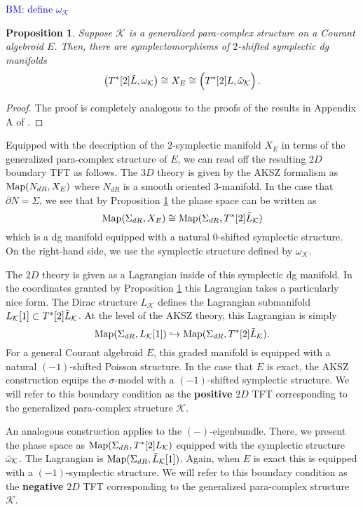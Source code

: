 \documentclass{article}
\newcommand{\KK}{\mathcal{K}}
\newtheorem{proposition}[theorem]{Proposition}
\theoremstyle{definition}
\theoremstyle{remark}
\def\brian{\textcolor{blue}{BM: }\textcolor{blue}}
\begin{document}
\brian{define $\omega_{\KK}$}

\begin{proposition}\label{prop: symp}
Suppose $\KK$ is a generalized para-complex structure on a Courant algebroid $E$.
Then, there are symplectomorphisms of $2$-shifted symplectic dg manifolds
\[
\left(T^*[2] \Tilde{L}, \omega_{\KK} \right) \cong X_E \cong \left(T^*[2] \overset{\;}{L}, \Tilde{\omega}_{\KK} \right) .
\]
\end{proposition}
\begin{proof}
The proof is completely analogous to the proofs of the results in Appendix A of \cite{Cattaneo:2009zx}.
\end{proof}

Equipped with the description of the $2$-symplectic manifold $X_E$ in terms of the generalized para-complex structure of $E$, we can read off the resulting $2D$ boundary TFT as follows.
The $3D$ theory is given by the AKSZ formalism as ${\rm Map}(N_{dR}, X_E)$ where $N_{dR}$ is a smooth oriented $3$-manifold.
In the case that $\partial N = \Sigma$, we see that by Proposition \ref{prop: symp} the phase space can be written as
\[
{\rm Map}(\Sigma_{dR} , X_E) \cong {\rm Map}(\Sigma_{dR}, T^*[2] \Tilde{L}_{\KK}) 
\]
which is a dg manifold equipped with a natural $0$-shifted symplectic structure.
On the right-hand side, we use the symplectic structure defined by $\omega_{\KK}$. 

The $2D$ theory is given as a Lagrangian inside of this symplectic dg manifold. 
In the coordinates granted by Proposition \ref{prop: symp} this Lagrangian takes a particularly nice form.
The Dirac structure $L_\KK$ defines the Lagrangian submanifold $L_\KK[1] \subset T^*[2] \Tilde{L}_{\KK}$. 
At the level of the AKSZ theory, this Lagrangian is simply
\[
{\rm Map}(\Sigma_{dR}, L_{\KK} [1])  \hookrightarrow {\rm Map}(\Sigma_{dR} , T^*[2] \Tilde{L}_{\KK}) .
\]
For a general Courant algebroid $E$, this graded manifold is equipped with a natural $(-1)$-shifted Poisson structure. 
In the case that $E$ is exact, the AKSZ construction equips the $\sigma$-model with a $(-1)$-shifted symplectic structure. 
We will refer to this boundary condition as the {\bf positive} $2D$ TFT corresponding to the generalized para-complex structure $\KK$. 

An analogous construction applies to the $(-)$-eigenbundle.
There, we present the phase space as ${\rm Map}(\Sigma_{dR}, T^*[2] L_{\KK})$ equipped with the symplectic structure $\Tilde{\omega}_{\KK}$. 
The Lagrangian is ${\rm Map}(\Sigma_{dR}, \Tilde{L}_{\KK} [1])$. 
Again, when $E$ is exact this is equipped with a $(-1)$-symplectic structure. 
We will refer to this boundary condition as the {\bf negative} $2D$ TFT corresponding to the generalized para-complex structure $\KK$. 
\end{document}
